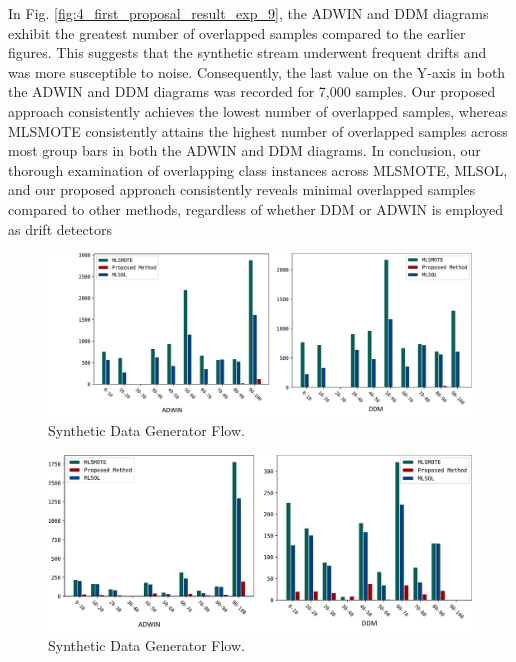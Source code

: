 In Fig. \ref{fig:4_first_proposal_result_exp_9}, the ADWIN and DDM diagrams exhibit the greatest number of overlapped samples compared to the earlier figures. This suggests that the synthetic stream underwent frequent drifts and was more susceptible to noise. Consequently, the last value on the Y-axis in both the ADWIN and DDM diagrams was recorded for 7,000 samples. Our proposed approach consistently achieves the lowest number of overlapped samples, whereas MLSMOTE consistently attains the highest number of overlapped samples across most group bars in both the ADWIN and DDM diagrams. In conclusion, our thorough examination of overlapping class instances across MLSMOTE, MLSOL, and our proposed approach consistently reveals minimal overlapped samples compared to other methods, regardless of whether DDM or ADWIN is employed as drift detectors

\begin{figure}[!ht]
	\centering
	\includegraphics[width=1\linewidth]{4_Taxonomy/figures/exp_7.png}
	\caption{Synthetic Data Generator Flow.}
	\label{fig:4_first_proposal_result_exp_7}
\end{figure}

\begin{figure}[!ht]
	\centering
	\includegraphics[width=1\linewidth]{4_Taxonomy/figures/exp_8.png}
	\caption{Synthetic Data Generator Flow.}
	\label{fig:4_first_proposal_result_exp_8}
\end{figure}

